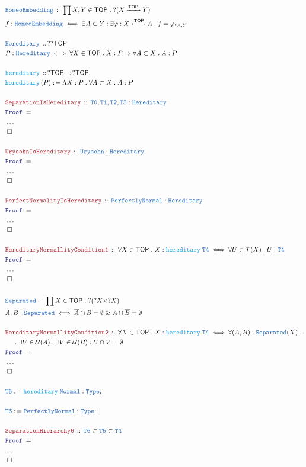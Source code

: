 \documentclass[12pt]{scrartcl}
\newcommand{\TYPE}[1]{\textcolor{NavyBlue}{\mathtt{#1}}}
\newcommand{\FUNC}[1]{\textcolor{Cerulean}{\mathtt{#1}}}
\newcommand{\LOGIC}[1]{\textcolor{Blue}{\mathtt{#1}}}
\newcommand{\THM}[1]{\textcolor{Maroon}{\mathtt{#1}}}
\renewcommand{\.}{\; . \;}
\newcommand{\de}{: \kern 0.1pc =}
\newcommand{\Act}[1]{\left( #1 \right)}
\newcommand{\Theorem}[2]{& \THM{#1} \, :: \, #2 \\ & \Proof = \\ }
\newcommand{\DeclareType}[2]{& \TYPE{#1} \, :: \, #2 \\}
\newcommand{\DefineType}[3]{& #1 : \TYPE{#2} \iff #3 \\}
\newcommand{\DeclareFunc}[2]{& \FUNC{#1} \, :: \, #2 \\}
\newcommand{\DefineFunc}[3]{&  \FUNC{#1}\Act{#2} \de #3 \\}
\newcommand{\NewLine}{\\ & \kern 1pc}
\newcommand{\Page}[1]{ \begin{align*} #1 \end{align*}   }
\newcommand{\NoProof}{ & \ldots \\ \EndProof}
\renewcommand{\And}{\; \& \;}
\newcommand{\Imply}{\Rightarrow}
\newcommand{\Type}{\TYPE{Type}}
\newcommand{\ToIso}{\xleftrightarrow}
\newcommand{\Arrow}{\xrightarrow}
\newcommand{\Conclude}[3]{& #1 \de #2 : #3; \\}
\newcommand{\QED}{\; \square}
\newcommand{\EndProof}{& \QED \\}
\newcommand{\Proof}{\LOGIC{Proof} \; }
\newcommand{\PN}{\TYPE{PerfectlyNormal}}
\newcommand{\TOP}{\mathsf{TOP}}
\newcommand{\T}{\mathcal{T}}
\newcommand{\U}{\mathcal{U}}
\begin{document}
\Page{
	\DeclareType{HomeoEmbedding}
	{
		\prod X,Y \in \TOP \.
		?( X \Arrow{\TOP} Y   )
	}
	\DefineType{f}{HomeoEmbedding}
	{ 
		\exists A \subset Y : 
		\exists \varphi : X \ToIso{\TOP} A \.   
		f = \varphi \iota_{A,Y}
	}
	\\
	\DeclareType{Hereditary}{??\TOP}
	\DefineType{P}{Hereditary}{\forall X \in \TOP \. X : P \Imply \forall A \subset X \. A : P}
	\\
	\DeclareFunc{hereditary}{?\TOP \to ?\TOP}
	\DefineFunc{hereditary}{P}{\Lambda X : P \. \forall A \subset X \. A : P}
	\\
	\Theorem{SeparationIsHereditary}{\TYPE{T0},\TYPE{T1},\TYPE{T2},\TYPE{T3} : \TYPE{Hereditary}}
	\NoProof
	\\
	\Theorem{UrysohnIsHereditary}{\TYPE{Urysohn} : \TYPE{Hereditary}}
	\NoProof
	\\
	\Theorem{PerfectNormalityIsHereditary}{\PN : \TYPE{Hereditary}}
	\NoProof
	\\
	\Theorem{HereditaryNormallityCondition1}
	{
		\forall X \in \TOP \.
		X : \FUNC{hereditary} \; \TYPE{T4} \iff
		\forall U \in \T(X) \. U : \TYPE{T4}
	}
	\NoProof
	\\
	\DeclareType{Separated}{\prod X \in \TOP \. ?(?X \times ?X)}
	\DefineType{A,B}{Separated}{\overline{A} \cap B = \emptyset \And A \cap \overline{B} = \emptyset}
	\\
	\Theorem{HereditaryNormallityCondition2}
	{
		\forall X \in \TOP \.
		X : \FUNC{hereditary} \; \TYPE{T4} \iff
		\forall (A, B) : \TYPE{Separated}(X) \. \NewLine \. 
		\exists U \in \U(A) :
		\exists V \in \U(B) :
		U \cap V = \emptyset
	}
	\NoProof
	\\
	\Conclude{\TYPE{T5}}{\FUNC{hereditary}\;\TYPE{Normal}}{\Type}
	\\
	\Conclude{\TYPE{T6}}{\PN}{\Type}
	\\
	\Theorem{SeparationHierarchy6}{\TYPE{T6} \subset \TYPE{T5} \subset \TYPE{T4}}
	\NoProof
}
\end{document}
